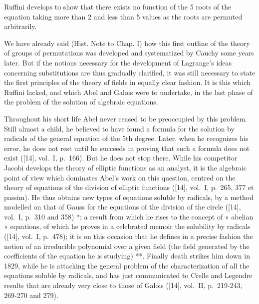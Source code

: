Ruffini develops to show that there exists no function of the 5 roots of the equation taking more than 2 and less than 5 values as the roots are permuted arbitrarily.

We have already said (Hist. Note to Chap. I) how this first outline of the theory of groups of permutations was developed and systematized by Cauchy some years later. But if the notions necessary for the development of Lagrange's ideas concerning substitutions are thus gradually clarified, it was still necessary to state the first principles of the theory of fields in equally clear fashion. It is this which Ruffini lacked, and which Abel and Galois were to undertake, in the last phase of the problem of the solution of algebraic equations.

Throughout his short life Abel never ceased to be preoccupied by this problem. Still almost a child, he believed to have found a formula for the solution by radicals of the general equation of the 5th degree. Later, when he recognizes his error, he does not rest until he succeeds in proving that such a formula does not exist ({[}14{]}, vol.~I, p.~166). But he does not stop there. While his competitor Jacobi develops the theory of elliptic functions as an analyst, it is the algebraic point of view which dominates Abel's work on this question, centred on the theory of equations of the division of elliptic functions ({[}14{]}, vol.~I, p.~265, 377 et passim). He thus obtains new types of equations soluble by radicals, by a method modelled on that of Gauss for the equations of the division of the circle ({[}14{]}, vol.~I, p.~310 and 358) *; a result from which he rises to the concept of « abelian » equations, of which he proves in a celebrated memoir the solubility by radicals ({[}14{]}, vol.~I, p.~478); it is on this occasion that he defines in a precise fashion the notion of an irreducible polynomial over a given field (the field generated by the coefficients of the equation he is studying) **. Finally death strikes him down in 1829, while he is attacking the general problem of the characterization of all the equations soluble by radicals, and has just communicated to Crelle and Legendre results that are already very close to those of Galois ({[}14{]}, vol.~II, p.~219-243, 269-270 and 279).

